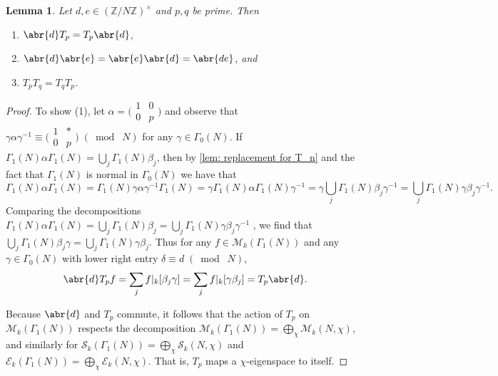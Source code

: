 \documentclass[10pt,leqno,twoside]{article}
\theoremstyle{plain}
\newtheorem{lemma}[lem]{Lemma}
\theoremstyle{definition}
\numberwithin{equation}{section}
\numberwithin{lem}{section}
\newcommand{\smod}[1]{\;(\bmod\; #1)}
\begin{document}
\begin{lemma}\label{lem: properties of baby heckes}
    Let $d,e\in(\mathbb Z/N\mathbb Z)^\times$ and $p,q$ be prime. Then \begin{enumerate}[label = \textup{(\arabic*)}]
        \item $\abr{d}T_p = T_p\abr{d}$,
        \item $\abr{d}\abr{e} = \abr{e}\abr{d} = \abr{de}$, and 
        \item $T_pT_q = T_qT_p$.
    \end{enumerate}
\end{lemma}
\begin{proof}
    To show (1), let $\alpha = \big(\!\begin{smallmatrix}
        1 & 0 \\ 0 & p
    \end{smallmatrix}\!\big)$ and observe that $\gamma\alpha\gamma^{-1}\equiv \big(\!\begin{smallmatrix}
        1 & \ast \\ 0 & p
    \end{smallmatrix}\!\big)\smod N$ for any $\gamma\in\varGamma_0(N)$. If $\varGamma_1(N)\alpha\varGamma_1(N) = \bigcup_j \varGamma_1(N)\beta_j$, then by \cref{lem: replacement for T_n} and the fact that $\varGamma_1(N)$ is normal in $\varGamma_0(N)$ we have that 
    \[\varGamma_1(N)\alpha\varGamma_1(N) = \varGamma_1(N)\gamma\alpha\gamma^{-1}\varGamma_1(N) = \gamma\varGamma_1(N)\alpha\varGamma_1(N)\gamma^{-1} = \gamma\bigcup_j \varGamma_1(N)\beta_j\gamma^{-1} = \bigcup_j \varGamma_1(N)\gamma\beta_j\gamma^{-1}.\] Comparing the decompositions $\varGamma_1(N)\alpha\varGamma_1(N) = \bigcup_j \varGamma_1(N)\beta_j = \bigcup_j \varGamma_1(N)\gamma\beta_j\gamma^{-1}$ , we find that $\bigcup_j \varGamma_1(N)\beta_j\gamma = \bigcup_j \varGamma_1(N)\gamma\beta_j$. Thus for any $f\in\mathcal M_k(\varGamma_1(N))$ and any $\gamma\in\varGamma_0(N)$ with lower right entry $\delta\equiv d\smod N$, 
    \[\abr{d}T_pf = \sum_j f|_k[\beta_j\gamma] = \sum_j f|_k[\gamma\beta_j] = T_p\abr{d}.\]

    Because $\abr{d}$ and $T_p$ commute, it follows that the action of $T_p$ on $\mathcal M_k(\varGamma_1(N))$ respects the decomposition $\mathcal M_k(\varGamma_1(N)) = \bigoplus_\chi\mathcal M_k(N,\chi)$, and similarly for $\mathcal S_k(\varGamma_1(N)) = \bigoplus_\chi\mathcal S_k(N,\chi)$ and $\mathcal E_k(\varGamma_1(N)) = \bigoplus_\chi\mathcal E_k(N,\chi)$. That is, $T_p$ maps a $\chi$-eigenspace to itself.


\end{proof}
\end{document}
